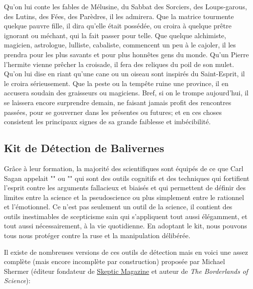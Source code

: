 	Qu'on lui conte les fables de Mélusine, du Sabbat des Sorciers, des Loups-garous, des Lutins, des Fées, des Parèdres, il les admirera. Que la matrice tourmente quelque pauvre fille, il dira qu'elle était possédée, ou croira à quelque prêtre ignorant ou méchant, qui la fait passer pour telle. Que quelque alchimiste, magicien, astrologue, lulliste, cabaliste, commencent un peu à le cajoler, il les prendra pour les plus savants et pour plus honnêtes gens du monde. Qu'un Pierre l'hermite vienne prêcher la croisade, il fera des reliques du poil de son mulet.
Qu'on lui dise en riant qu'une cane ou un oiseau sont inspirés du Saint-Esprit, il le croira sérieusement. Que la peste ou la tempête ruine une province, il en accusera soudain des graisseurs ou magiciens. Bref, si on le trompe aujourd'hui, il se laissera encore surprendre demain, ne faisant jamais profit des rencontres passées, pour se gouverner dans les présentes ou futures; et en ces choses consistent les principaux signes de sa grande faiblesse et imbécibilité.\fg{}
	
	\pagebreak
	\subsection{Kit de D\'etection de Balivernes }
	Grâce à leur formation, la majorit\'e des scientifiques sont \'equip\'es de ce que Carl Sagan appelait "" ou "" qui sont des outils cognitifs et des techniques qui fortifient l'esprit contre les arguments fallacieux et biais\'es et qui permettent de d\'efinir des limites entre la science et la pseudoscience ou plus simplement entre le rationnel et l'\'emotionnel. Ce n'est pas seulement un outil de la science, il contient des outils inestimables de scepticisme sain qui s'appliquent tout aussi \'el\'egamment, et tout aussi n\'ecessairement, à la vie quotidienne. En adoptant le kit, nous pouvons tous nous prot\'eger contre la ruse et la manipulation d\'elib\'er\'ee.
	
	Il existe de nombreuses versions de ces outils de d\'etection mais en voici une assez complète (mais encore incomplète par construction) propos\'ee par Michael Shermer (\'editeur fondateur de \href{http://www.skeptic.com}{Skeptic Magazine} et auteur de \textit{The Borderlands of Science}):
	

